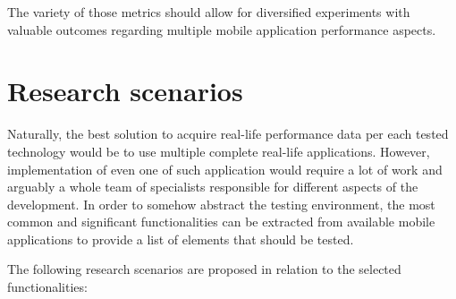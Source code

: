 The variety of those metrics should allow for diversified experiments with valuable outcomes regarding multiple mobile application performance aspects.

\section{Research scenarios}\label{chap:research_scenarios}

Naturally, the best solution to acquire real-life performance data per each tested technology would be to use multiple complete real-life applications. However, implementation of even one of such application would require a lot of work and arguably a whole team of specialists responsible for different aspects of the development. In order to somehow abstract the testing environment, the most common and significant functionalities can be extracted from available mobile applications to provide a list of elements that should be tested.

\bigskip

The following research scenarios are proposed in relation to the selected functionalities:

